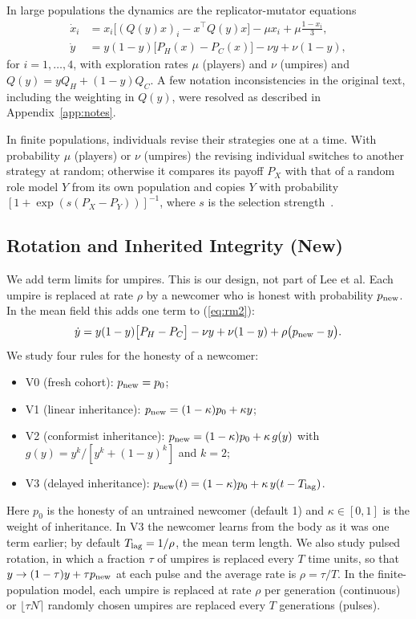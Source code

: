 \documentclass[journal]{IEEEtran}
\begin{document}
In large populations the dynamics are the replicator-mutator equations
\begin{align}
\dot x_i &= x_i\big[(Q(y)x)_i - x^{\top}Q(y)x\big] - \mu x_i + \mu\tfrac{1-x_i}{3},\label{eq:rm1}\\
\dot y &= y(1-y)\big[P_H(x)-P_C(x)\big] - \nu y + \nu(1-y),\label{eq:rm2}
\end{align}
for $i=1,\dots,4$, with exploration rates $\mu$ (players) and $\nu$ (umpires) and
$Q(y)=yQ_H+(1-y)Q_C$. A few notation inconsistencies in the original text,
including the weighting in $Q(y)$, were resolved as described in Appendix~\ref{app:notes}.

In finite populations, individuals revise their strategies one at a time. With probability $\mu$
(players) or $\nu$ (umpires) the revising individual switches to another strategy at random;
otherwise it compares its payoff $P_X$ with that of a random role model $Y$ from its own
population and copies $Y$ with probability $[1+\exp(s(P_X-P_Y))]^{-1}$, where $s$ is the
selection strength~\cite{szabo1998fermi,traulsen2006fixation}.

\subsection{Rotation and Inherited Integrity (New)}\label{sec:rotation}

We add term limits for umpires. This is our design, not part of Lee et al. Each umpire is
replaced at rate $\rho$ by a newcomer who is honest with probability $p_{\rm new}$. In the mean
field this adds one term to (\ref{eq:rm2}):
\begin{equation}
\dot y = y(1-y)\big[P_H-P_C\big] - \nu y + \nu(1-y) + \rho\big(p_{\rm new}-y\big).\label{eq:rot}
\end{equation}
We study four rules for the honesty of a newcomer:
\begin{itemize}
\item V0 (fresh cohort): $p_{\rm new}=p_0$;
\item V1 (linear inheritance): $p_{\rm new}=(1-\kappa)p_0+\kappa y$;
\item V2 (conformist inheritance): $p_{\rm new}=(1-\kappa)p_0+\kappa\, g(y)$ with
$g(y)=y^k/[y^k+(1-y)^k]$ and $k=2$;
\item V3 (delayed inheritance): $p_{\rm new}(t)=(1-\kappa)p_0+\kappa\, y(t-T_{\rm lag})$.
\end{itemize}
Here $p_0$ is the honesty of an untrained newcomer (default 1) and $\kappa\in[0,1]$ is the weight
of inheritance. In V3 the newcomer learns from the body as it was one term earlier; by default
$T_{\rm lag}=1/\rho$, the mean term length. We also study pulsed rotation, in which a fraction
$\tau$ of umpires is replaced every $T$ time units, so that $y\to(1-\tau)y+\tau p_{\rm new}$ at
each pulse and the average rate is $\rho=\tau/T$. In the finite-population model, each umpire is
replaced at rate $\rho$ per generation (continuous) or $\lfloor\tau N\rceil$ randomly chosen
umpires are replaced every $T$ generations (pulses).
\end{document}
